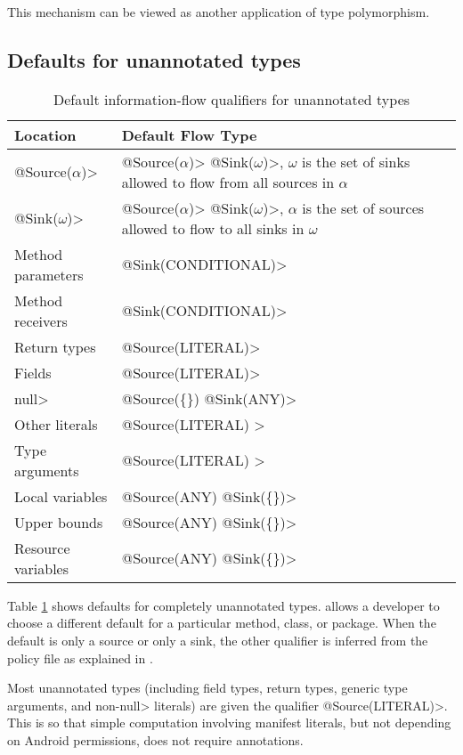 This mechanism can be viewed as another application of type polymorphism.


\subsection{Defaults for unannotated types}
\label{sec:unannotated-types}


\begin{table}
  \caption{Default information-flow qualifiers for unannotated types}
  \begin{tabular}{l l}
  \hline
    \bf{Location} & \bf{Default Flow Type}\\
  \hline
     \<@Source($\alpha$)>&\<@Source($\alpha$)>
       \<@Sink($\omega$)>,  $\omega$ is the set of  sinks allowed to flow from all sources in $\alpha$ \\
     \<@Sink($\omega$)>&\<@Source($\alpha$)>
       \<@Sink($\omega$)>, $\alpha$ is the set of  sources allowed to flow to all sinks in $\omega$ \\
    Method parameters &  \<@Sink(CONDITIONAL)> \\
    Method receivers &  \<@Sink(CONDITIONAL)> \\
    Return types &  \<@Source(LITERAL)> \\
    Fields &  \<@Source(LITERAL)> \\
    \<null> &  \<@Source(\{\}) @Sink(ANY)>\\
    Other literals & \<@Source(LITERAL) >\\
    Type arguments & \<@Source(LITERAL) >\\
    Local variables &   \<@Source(ANY) @Sink(\{\})> \\
    Upper bounds &   \<@Source(ANY) @Sink(\{\})> \\
    Resource variables  &   \<@Source(ANY) @Sink(\{\})> \\
  
  \end{tabular}

  \label{tab:defaults}
\end{table}

Table \ref{tab:defaults} shows defaults for completely unannotated types.
\TheFlowChecker allows a developer to choose a different default for a
particular method, class, or package.
When the default is only a source or only a sink, the other qualifier is
inferred from the policy file as explained in
.

Most unannotated types (including field types, return
types, generic type arguments, and non-\<null>
literals) are given the qualifier \<@Source(LITERAL)>.  
This is so that simple computation involving manifest literals, but not
depending on Android permissions, does not require 
annotations. 

